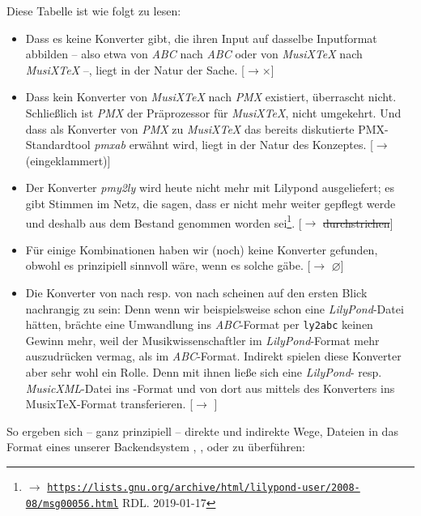 Diese Tabelle ist wie folgt zu lesen:

\begin{itemize}
  \item Dass es keine Konverter gibt, die ihren Input auf dasselbe Inputformat
  abbilden -- also etwa von \textit{ABC} nach \textit{ABC} oder von
  \textit{MusiX\TeX} nach \textit{MusiX\-\TeX} --, liegt in der Natur der Sache.
  [$\rightarrow \times$]
  \item Dass kein Konverter von \textit{MusiX\TeX} nach \textit{PMX} existiert,
  überrascht nicht. Schließlich ist \textit{PMX} der Präprozessor für
  \textit{MusiX\TeX}, nicht umgekehrt. Und dass als Konverter von \textit{PMX}
  zu \textit{MusiX\TeX} das bereits diskutierte PMX-Standardtool \textit{pmxab}
  erwähnt wird, liegt in der Natur des Konzeptes. [$\rightarrow$
  (eingeklammert)]
  \item Der Konverter \textit{pmy2ly} wird heute nicht mehr mit Lilypond
  ausgeliefert; es gibt Stimmen im Netz, die sagen, dass er nicht mehr weiter
  gepflegt werde und deshalb aus dem Bestand genommen worden sei\footnote{$\rightarrow$
  \href{https://lists.gnu.org/archive/html/lilypond-user/2008-08/msg00056.html}{
  \texttt{https://lists.gnu.org/archive/html/lilypond-user/2008-08/msg00056.html}}
  RDL. 2019-01-17}. [$\rightarrow$ \sout{durchstrichen}]
  \item Für einige Kombinationen haben wir (noch) keine Konverter gefunden,
  obwohl es prinzipiell sinnvoll wäre, wenn es solche gäbe. [$\rightarrow$
  $\varnothing$] 
  \item Die Konverter von  nach  resp. von 
  nach  scheinen auf den ersten Blick nachrangig zu sein: Denn wenn wir
  beispielsweise schon eine \textit{LilyPond}-Datei hätten, brächte eine
  Umwandlung ins \textit{ABC}-Format per \texttt{ly2abc} keinen Gewinn mehr,
  weil der Musikwissenschaftler im \textit{LilyPond}-Format mehr auszudrücken
  vermag, als im \textit{ABC}-Format. Indirekt spielen diese Konverter aber sehr
  wohl ein Rolle. Denn mit ihnen ließe sich eine \textit{LilyPond}- resp.
  \textit{MusicXML}-Datei ins -Format und von dort aus mittels des
  Konverters  ins Musix\TeX-Format transferieren.
  [$\rightarrow$ ]
\end{itemize}

So ergeben sich -- ganz prinzipiell -- direkte und indirekte Wege,
Dateien in das Format eines unserer Backendsystem , , 
 oder  zu überführen:

